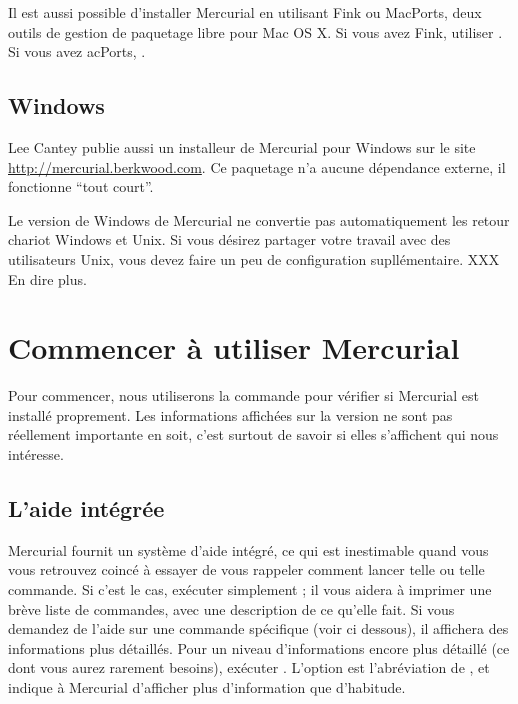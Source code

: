 Il est aussi possible d'installer Mercurial en utilisant Fink ou MacPorts,
deux outils de gestion de paquetage libre pour Mac OS X. Si vous avez 
Fink, utiliser . Si vous avez 
acPorts, .

\subsection{Windows}

Lee Cantey publie aussi un installeur de Mercurial pour Windows sur le site
\url{http://mercurial.berkwood.com}. Ce paquetage n'a aucune dépendance 
externe, il fonctionne ``tout court''.

\begin{note}
  Le version de Windows de Mercurial ne convertie pas automatiquement
  les retour chariot Windows et Unix. Si vous désirez partager votre
  travail avec des utilisateurs Unix, vous devez faire un peu de configuration
  supllémentaire. XXX En dire plus.
\end{note}

\section{Commencer à utiliser Mercurial}

Pour commencer, nous utiliserons la commande  pour vérifier
si Mercurial est installé proprement. Les informations affichées sur la 
version ne sont pas réellement importante en soit, c'est surtout de savoir
si elles s'affichent qui nous intéresse.

\subsection{L'aide intégrée}

Mercurial fournit un système d'aide intégré, ce qui est inestimable quand
vous vous retrouvez coincé à essayer de vous rappeler comment lancer telle
ou telle commande. 
Si c'est le cas, exécuter simplement ; il vous aidera à imprimer
une brève liste de commandes, avec une description de ce qu'elle fait. Si vous
demandez de l'aide sur une commande spécifique (voir ci dessous), il affichera
des informations plus détaillés.
Pour un niveau d'informations encore plus détaillé (ce dont vous aurez rarement
besoins), exécuter .  L'option  est 
l'abréviation de , et indique à Mercurial d'afficher plus 
d'information que d'habitude.

